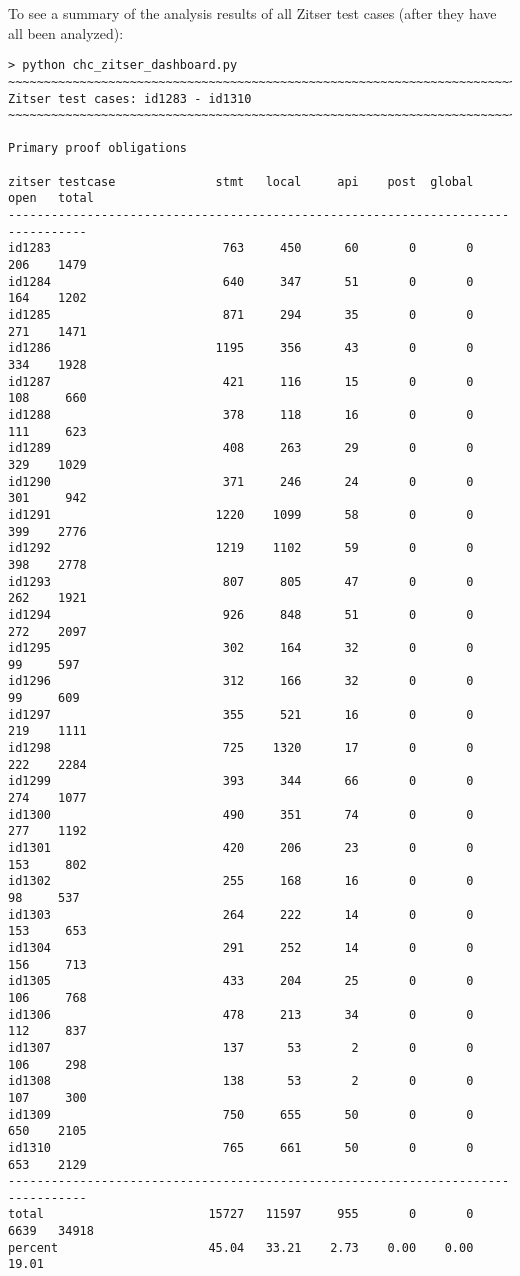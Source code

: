 \documentclass[11pt]{article}
\begin{document}
To see a summary of the analysis results of all Zitser test cases (after they have
all been analyzed):
\begin{scriptsize}
\begin{verbatim}
> python chc_zitser_dashboard.py
~~~~~~~~~~~~~~~~~~~~~~~~~~~~~~~~~~~~~~~~~~~~~~~~~~~~~~~~~~~~~~~~~~~~~~~~~~~~~~~~
Zitser test cases: id1283 - id1310
~~~~~~~~~~~~~~~~~~~~~~~~~~~~~~~~~~~~~~~~~~~~~~~~~~~~~~~~~~~~~~~~~~~~~~~~~~~~~~~~

Primary proof obligations

zitser testcase              stmt   local     api    post  global    open   total
---------------------------------------------------------------------------------
id1283                        763     450      60       0       0     206    1479
id1284                        640     347      51       0       0     164    1202
id1285                        871     294      35       0       0     271    1471
id1286                       1195     356      43       0       0     334    1928
id1287                        421     116      15       0       0     108     660
id1288                        378     118      16       0       0     111     623
id1289                        408     263      29       0       0     329    1029
id1290                        371     246      24       0       0     301     942
id1291                       1220    1099      58       0       0     399    2776
id1292                       1219    1102      59       0       0     398    2778
id1293                        807     805      47       0       0     262    1921
id1294                        926     848      51       0       0     272    2097
id1295                        302     164      32       0       0      99     597
id1296                        312     166      32       0       0      99     609
id1297                        355     521      16       0       0     219    1111
id1298                        725    1320      17       0       0     222    2284
id1299                        393     344      66       0       0     274    1077
id1300                        490     351      74       0       0     277    1192
id1301                        420     206      23       0       0     153     802
id1302                        255     168      16       0       0      98     537
id1303                        264     222      14       0       0     153     653
id1304                        291     252      14       0       0     156     713
id1305                        433     204      25       0       0     106     768
id1306                        478     213      34       0       0     112     837
id1307                        137      53       2       0       0     106     298
id1308                        138      53       2       0       0     107     300
id1309                        750     655      50       0       0     650    2105
id1310                        765     661      50       0       0     653    2129
---------------------------------------------------------------------------------
total                       15727   11597     955       0       0    6639   34918
percent                     45.04   33.21    2.73    0.00    0.00   19.01


\end{verbatim}
\end{scriptsize}
\end{document}
